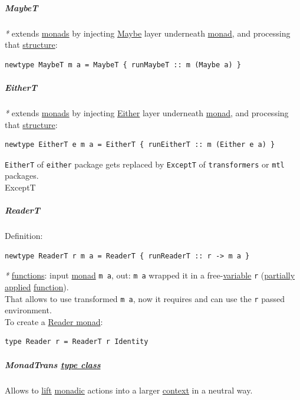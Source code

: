 \documentclass[a4paper,14pt,oneside]{book}
\begin{document}
\subparagraph{\label{org22a0819}MaybeT}
\label{sec:orgf55a3f5}
\emph{*} extends \hyperref[orgb4d8700]{monads} by injecting \hyperref[orgd5b5282]{Maybe} layer underneath \hyperref[org27993ff]{monad}, and processing that \hyperref[org2f999c6]{structure}:\\
\begin{verbatim}
newtype MaybeT m a = MaybeT { runMaybeT :: m (Maybe a) }
\end{verbatim}

\subparagraph{\label{orgd4a2ea4}EitherT}
\label{sec:org394449f}
\emph{*} extends \hyperref[orgb4d8700]{monads} by injecting \hyperref[org742f4bf]{Either} layer underneath \hyperref[org27993ff]{monad}, and processing that \hyperref[org2f999c6]{structure}:\\

\begin{verbatim}
newtype EitherT e m a = EitherT { runEitherT :: m (Either e a) }
\end{verbatim}

\texttt{EitherT} of \texttt{either} package gets replaced by \texttt{ExceptT} of \texttt{transformers} or \texttt{mtl} packages.\\

\subsubparagraph{\emph{*}}
\label{sec:orgcb5289e}
\label{org26d3cb1}ExceptT\\

\subparagraph{\label{orga5a39c8}ReaderT}
\label{sec:org43a7bb0}
Definition:\\
\begin{verbatim}
newtype ReaderT r m a = ReaderT { runReaderT :: r -> m a }
\end{verbatim}

\emph{*} \hyperref[org0da3116]{functions}: input \hyperref[org27993ff]{monad} \texttt{m a}, out: \texttt{m a} wrapped it in a free-\hyperref[org3ae9925]{variable} \texttt{r} (\hyperref[org0e354c4]{partially applied} \hyperref[org25ee224]{function}).\\
That allows to use transformed \texttt{m a}, now it requires and can use the \texttt{r} passed environment.\\

To create a \hyperref[orgd16a797]{Reader monad}:\\

\begin{verbatim}
type Reader r = ReaderT r Identity
\end{verbatim}

\subparagraph{\label{org6e344be}MonadTrans \hyperref[org997da45]{type class}}
\label{sec:orge78c5eb}
Allows to \hyperref[org85fe484]{lift} \hyperref[org6161b39]{monadic} actions into a larger \hyperref[orga293794]{context} in a neutral way.\\
\end{document}
